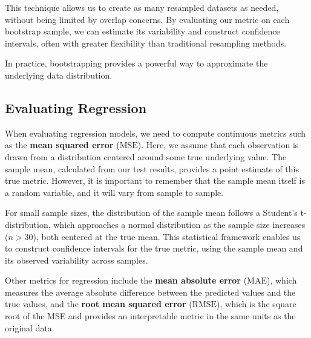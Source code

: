 This technique allows us to create as many resampled datasets as needed, without being limited by overlap concerns.
By evaluating our metric on each bootstrap sample, we can estimate its variability and construct confidence intervals, often with greater flexibility than traditional resampling methods.

In practice, bootstrapping provides a powerful way to approximate the underlying data distribution.

\subsection{Evaluating Regression}
When evaluating regression models, we need to compute continuous metrics such as the \textbf{mean squared error} ($\text{MSE}$).
Here, we assume that each observation is drawn from a distribution centered around some true underlying value.
The sample mean, calculated from our test results, provides a point estimate of this true metric.
However, it is important to remember that the sample mean itself is a random variable, and it will vary from sample to sample.

For small sample sizes, the distribution of the sample mean follows a Student's t-distribution, which approaches a normal distribution as the sample size increases ($n > 30$), both centered at the true mean.
This statistical framework enables us to construct confidence intervals for the true metric, using the sample mean and its observed variability across samples.

Other metrics for regression include the \textbf{mean absolute error} ($\text{MAE}$), which measures the average absolute difference between the predicted values and the true values, 
and the \textbf{root mean squared error} ($\text{RMSE}$), which is the square root of the MSE and provides an interpretable metric in the same units as the original data.

